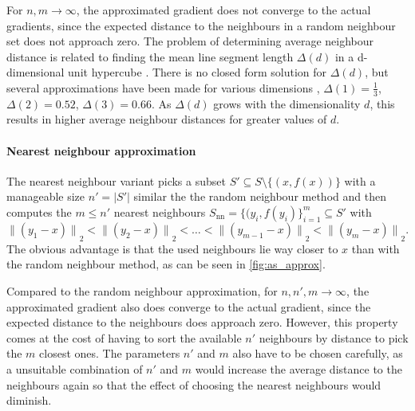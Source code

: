 \documentclass[
  a4paper,  %
  twoside,  %
  bibliography=totoc,
  headsepline,
  cleardoublepage=empty,
  parskip=half,
  draft=false
]{scrbook}
\begin{document}
For $n,m \to \infty$, the approximated gradient does not converge to the actual gradients, since the expected distance to the neighbours in a random neighbour set does not approach zero.
The problem of determining average neighbour distance is related to finding the mean line segment length $\Delta (d)$ in a d-dimensional unit hypercube \cite{Bailey2007}.
There is no closed form solution for $\Delta (d)$, but several approximations have been made for various dimensions \cite{Weisstein}, \eg $\Delta (1)=\frac{1}{3}$, $\Delta (2)=0.52$, $\Delta (3)=0.66$.
As $\Delta (d)$ grows with the dimensionality $d$, this results in higher average neighbour distances for greater values of $d$.

\paragraph{Nearest neighbour approximation}
The nearest neighbour variant picks a subset $S' \subseteq S \setminus \{(x, f(x))\}$ with a manageable size $n'=|S'|$ similar the the random neighbour method and then computes the $m \leq n'$ nearest neighbours $S_{\text{nn}}=\{(y_i, f(y_i)\}_{i=1}^m \subseteq S'$ with
\begin{equation}
{\|(y_1-x)\|}_2 < {\|(y_2-x)\|}_2 < \dots < {\|(y_{m-1}-x)\|}_2 < {\|(y_{m}-x)\|}_2.
\end{equation}
The obvious advantage is that the used neighbours lie way closer to $x$ than with the random neighbour method, as can be seen in \cref{fig:as_approx}.

Compared to the random neighbour approximation, for $n,n',m \to \infty$, the approximated gradient also does converge to the actual gradient, since the expected distance to the neighbours does approach zero.
However, this property comes at the cost of having to sort the available $n'$ neighbours by distance to pick the $m$ closest ones.
The parameters $n'$ and $m$ also have to be chosen carefully, as a unsuitable combination of $n'$ and $m$ would increase the average distance to the neighbours again so that the effect of choosing the nearest neighbours would diminish.
\end{document}
